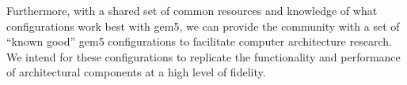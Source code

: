 Furthermore, with a shared set of common resources and knowledge of what configurations work best with gem5, we can provide the community with a set of ``known good'' gem5 configurations to facilitate computer architecture research.
We intend for these configurations to replicate the functionality and performance of architectural components at a high level of fidelity.

